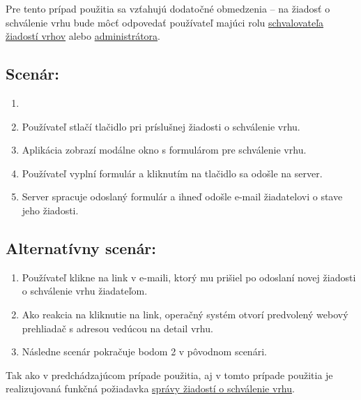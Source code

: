 Pre tento prípad použitia sa vzťahujú dodatočné obmedzenia -- na žiadosť o schválenie vrhu bude môcť odpovedať používateľ majúci rolu \hyperref[schvalovatel-vrhov]{schvalovateľa žiadostí vrhov} alebo \hyperref[administrator]{administrátora}.

\subsection*{Scenár:}

\begin{enumerate}
	\item {}
	\item Používateľ stlačí tlačidlo  pri príslušnej žiadosti o schválenie vrhu.
	\item Aplikácia zobrazí modálne okno s formulárom pre schválenie vrhu.
	\item Používateľ vyplní formulár a kliknutím na tlačidlo  sa odošle na server.
	\item Server spracuje odoslaný formulár a ihneď odošle e-mail žiadatelovi o stave jeho žiadosti.
\end{enumerate}

\subsection*{Alternatívny scenár:}

\begin{enumerate}
	\item Používateľ klikne na link v e-maili, ktorý mu prišiel po odoslaní novej žiadosti o schválenie vrhu žiadateľom.
	\item Ako reakcia na kliknutie na link, operačný systém otvorí predvolený webový prehliadač s adresou vedúcou na detail vrhu.
	\item Následne scenár pokračuje bodom 2 v pôvodnom scenári.
\end{enumerate}

Tak ako v predchádzajúcom prípade použitia, aj v tomto prípade použitia je realizujovaná funkčná požiadavka \hyperref[sprava-ziadosti-o-schvalenie-vrhu]{správy žiadostí o schválenie vrhu}.
	